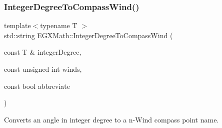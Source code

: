 \mbox{\label{group___e_g_x_math-_angle_conversions-_integer_degree_ga01abeefd29282a3c88d3d3c28fd2c6fa}} 
\subsubsection{\texorpdfstring{Integer\+Degree\+To\+Compass\+Wind()}{IntegerDegreeToCompassWind()}}
{\footnotesize\ttfamily template$<$typename T $>$ \\
std\+::string E\+G\+X\+Math\+::\+Integer\+Degree\+To\+Compass\+Wind (\begin{DoxyParamCaption}\item[{const T \&}]{integer\+Degree,  }\item[{const unsigned int}]{winds,  }\item[{const bool}]{abbreviate }\end{DoxyParamCaption})}



Converts an angle in integer degree to a n-\/\+Wind compass point name. 

